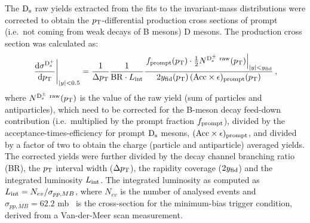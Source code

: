 The ${\rm D_s}$ raw yields extracted from the fits to the invariant-mass distributions
were corrected to obtain the $p_{\rm T}$-differential production cross sections of prompt 
(i.e.\ not coming from weak decays of B mesons) D mesons.
The production cross section
was calculated as:
\begin{equation}
  \label{eq:dsdpt}
  \left.\frac{{\rm d} \sigma^{\rm D^{+}_{\rm s}}}{{\rm d}p_{\rm T}}\right|_{|y|<0.5}=
  \frac{1}{ \Delta p_{\rm T}}\frac{1}{{\rm BR} \cdot L_{\rm int}}\frac{\left.f_{\rm prompt}(p_{\rm T})\cdot \frac{1}{2} N^{\rm D^\pm_{\rm s}~raw}(p_{\rm T})\right|_{|y|<y_{\rm fid}}}{ 2 y_{\rm fid}(p_{\rm T}) \,({\rm Acc}\times\epsilon)_{\rm prompt}(p_{\rm T})}\,,
\end{equation}
where $N^{\rm D^\pm_{\rm s}~raw}(p_{\rm T})$ is the value of the raw yield 
(sum of particles and antiparticles),
 which need to be corrected for the B-meson decay feed-down contribution 
(i.e.\ multiplied by the prompt fraction $f_{\rm{prompt}}$), divided by the 
acceptance-times-efficiency for prompt ${\rm D_s}$ mesons, 
$(\rm Acc \times \epsilon)_{\rm{prompt}}$, and divided by a factor of two to 
obtain the charge (particle and antiparticle) averaged yields.
The corrected yields were further divided by the decay channel branching ratio (BR), 
the $p_{\rm T}$ interval width ($\Delta p_{\rm T}$), the rapidity coverage 
($2 y_{\rm fid}$) and the integrated luminosity $L_{\rm int}$.
The integrated luminosity as computed as $L_{\rm int} = N_{ev}/\sigma_{pp,MB}$,
where $N_{ev}$ is the number of analysed events and 
$\sigma_{pp,MB} = 62.2$ mb~\cite{Abelev:2012sea}
is the cross-section for the minimum-bias trigger condition, derived from
a Van-der-Meer scan measurement.


